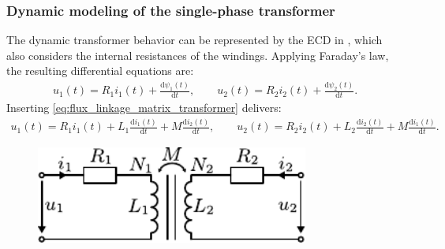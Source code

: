 \begin{frame}
	\frametitle{Dynamic modeling of the single-phase transformer}
		The dynamic transformer behavior can be represented by the ECD in , which also considers the internal resistances of the windings. Applying Faraday's law, the resulting differential equations are:
		\begin{align}
			u_1(t) = R_1 i_1(t) + \frac{\mathrm{d}\psi_1(t)}{\mathrm{d}t}, \qquad u_2(t) = R_2 i_2(t) + \frac{\mathrm{d}\psi_2(t)}{\mathrm{d}t}. \label{eq:transformer_differential_equations}
		\end{align}
		Inserting \eqref{eq:flux_linkage_matrix_transformer} delivers:
		\begin{align}
			u_1(t) = R_1 i_1(t) + L_1 \frac{\mathrm{d}i_1(t)}{\mathrm{d}t} + M \frac{\mathrm{d}i_2(t)}{\mathrm{d}t}, \qquad
			u_2(t) = R_2 i_2(t) + L_2 \frac{\mathrm{d}i_2(t)}{\mathrm{d}t} + M \frac{\mathrm{d}i_1(t)}{\mathrm{d}t}. \label{eq:transformer_differential_equations_2}
		\end{align}
		
\begin{figure}
\begin{columns}
	\begin{column}{0.55\textwidth}
            \centering
            \includegraphics[width=0.8\textwidth]{fig/lec04/General_transformer_ECD.pdf}
    \end{column}
\end{columns}
\end{figure}
\end{frame}

